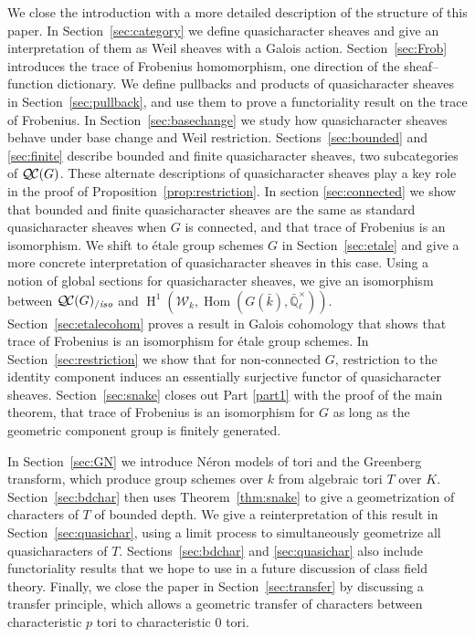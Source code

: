 \documentclass[11pt]{amsart}
\theoremstyle{plain}
\theoremstyle{definition}
\theoremstyle{remark}
\newcommand{\EE}{\mathbb{\bar Q}_\ell}
\newcommand{\bFq}{\bar{k}}
\newcommand{\Fq}{k}
\newcommand{\EEx}{\EE^\times}
\DeclareMathOperator{\Hom}{Hom}
\DeclareMathOperator{\Hh}{H}
\newcommand{\QC}{{\mathcal{Q\hskip-0.8pt C}}}
\newcommand{\QCiso}[1]{\QC(#1)_{/\textit{iso}}}
\newcommand{\Weil}[1]{\mathcal{W}_{#1}}
\begin{document}
We close the introduction with a more detailed description of the structure of this paper.
In Section~\ref{sec:category} we define quasicharacter sheaves and give an interpretation of
them as Weil sheaves with a Galois action.
Section~\ref{sec:Frob} introduces the trace of Frobenius homomorphism,
one direction of the sheaf--function dictionary.
We define pullbacks and products of quasicharacter sheaves in Section~\ref{sec:pullback}, and use
them to prove a functoriality result on the trace of Frobenius.
In Section~\ref{sec:basechange} we study how quasicharacter sheaves behave under base change
and Weil restriction.
Sections~\ref{sec:bounded} and \ref{sec:finite} describe bounded and finite quasicharacter sheaves,
two subcategories of $\QC(G)$.  These alternate descriptions of quasicharacter sheaves play a key
role in the proof of Proposition~\ref{prop:restriction}.
In section \ref{sec:connected} we show that bounded and finite quasicharacter sheaves are the same
as standard quasicharacter sheaves when $G$ is connected, and that trace of Frobenius is an isomorphism.
We shift to \'etale group schemes $G$ in Section~\ref{sec:etale} and give a more concrete interpretation
of quasicharacter sheaves in this case.  Using a notion of global sections for quasicharacter sheaves,
we give an isomorphism between $\QCiso{G}$ and $\Hh^1(\Weil{\Fq}, \Hom(G(\bFq), \EEx))$.
Section~\ref{sec:etalecohom} proves a result in Galois cohomology that shows that trace of Frobenius is
an isomorphism for \'etale group schemes.
In Section~\ref{sec:restriction} we show that for non-connected $G$, restriction to the identity component
induces an essentially surjective functor of quasicharacter sheaves.
Section~\ref{sec:snake} closes out Part \ref{part1} with the proof of the main theorem, that trace of Frobenius
is an isomorphism for $G$ as long as the geometric component group is finitely generated.

In Section~\ref{sec:GN} we introduce N\'eron models of tori and the Greenberg transform, which produce
group schemes over $\Fq$ from algebraic tori $T$ over $K$.
Section~\ref{sec:bdchar} then uses Theorem~\ref{thm:snake} to give a geometrization of characters of $T$
of bounded depth.
We give a reinterpretation of this result in Section~\ref{sec:quasichar}, using a limit process to simultaneously
geometrize all quasicharacters of $T$.  Sections~\ref{sec:bdchar} and \ref{sec:quasichar} also include
functoriality results that we hope to use in a future discussion of class field theory.
Finally, we close the paper in Section~\ref{sec:transfer} by discussing a transfer principle, which allows
a geometric transfer of characters between characteristic $p$ tori to characteristic $0$ tori.
\end{document}
